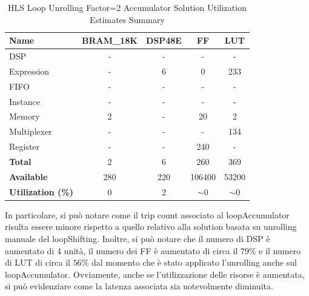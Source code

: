 \begin{table}[H]
	\centering
	\begin{tabular}{|l|c|c|c|c|}
		\hline
		\textbf{Name}    & \textbf{BRAM\_18K} & \textbf{DSP48E} & \textbf{FF} & \textbf{LUT} \\ \hline
		DSP              & -                   & -               & -           & -            \\ 
		Expression       & -                   & 6               & 0           & 233          \\ 
		FIFO             & -                   & -               & -           & -            \\ 
		Instance         & -                   & -               & -           & -            \\ 
		Memory           & 2                   & -               & 20          & 2            \\ 
		Multiplexer      & -                   & -               & -           & 134          \\ 
		Register         & -                   & -               & 240         & -            \\ \hline
		\textbf{Total}   & 2                   & 6               & 260         & 369          \\ \hline
		\textbf{Available} & 280               & 220             & 106400      & 53200        \\ \hline
		\textbf{Utilization (\%)} & 0            & 2              & $\sim$0     & $\sim$0      \\ \hline
	\end{tabular}
	\caption{HLS Loop Unrolling Factor=2 Accumulator Solution Utilization Estimates Summary}
	\label{tab:hls-loop-unrolling2-accumulator-solution-utilization-estimates-summary}
\end{table}

In particolare, si può notare come il trip count associato al loopAccumulator risulta essere minore rispetto a quello relativo alla solution basata su unrolling manuale del loopShifting. Inoltre, si può notare che il numero di DSP è aumentato di 4 unità, il numero dei FF è aumentato di circa il $79\%$ e il numero di LUT di circa il $56\%$ dal momento che è stato applicato l'unrolling anche sul loopAccumulator. Ovviamente, anche se l'utilizzazione delle risorse è aumentata, si può evidenziare come la latenza associata sia notevolmente diminuita.